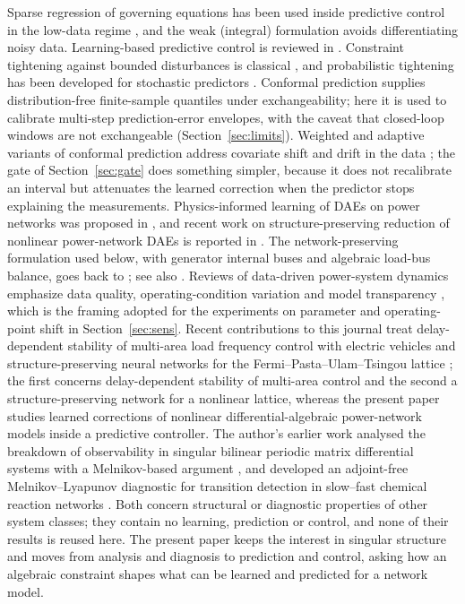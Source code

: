 \documentclass[preprint,12pt]{elsarticle}
\begin{document}
Sparse regression of governing equations \cite{brunton} has been used inside predictive control in the low-data regime \cite{kaiser}, and the weak (integral) formulation \cite{wsindy} avoids differentiating noisy data. Learning-based predictive control is reviewed in \cite{hewing}. Constraint tightening against bounded disturbances is classical \cite{mayne}, and probabilistic tightening has been developed for stochastic predictors \cite{lorenzen}. Conformal prediction \cite{vovk,angelopoulos} supplies distribution-free finite-sample quantiles under exchangeability; here it is used to calibrate multi-step prediction-error envelopes, with the caveat that closed-loop windows are not exchangeable (Section~\ref{sec:limits}). Weighted and adaptive variants of conformal prediction address covariate shift and drift in the data \cite{tibshirani,barber,gibbs}; the gate of Section~\ref{sec:gate} does something simpler, because it does not recalibrate an interval but attenuates the learned correction when the predictor stops explaining the measurements. Physics-informed learning of DAEs on power networks was proposed in \cite{moya}, and recent work on structure-preserving reduction of nonlinear power-network DAEs is reported in \cite{nadeem,banagaaya}. The network-preserving formulation used below, with generator internal buses and algebraic load-bus balance, goes back to \cite{bergenhill}; see also \cite{dorfler,kundur}. Reviews of data-driven power-system dynamics emphasize data quality, operating-condition variation and model transparency \cite{huang}, which is the framing adopted for the experiments on parameter and operating-point shift in Section~\ref{sec:sens}. Recent contributions to this journal treat delay-dependent stability of multi-area load frequency control with electric vehicles \cite{xiong} and structure-preserving neural networks for the Fermi--Pasta--Ulam--Tsingou lattice \cite{fan}; the first concerns delay-dependent stability of multi-area control and the second a structure-preserving network for a nonlinear lattice, whereas the present paper studies learned corrections of nonlinear differential-algebraic power-network models inside a predictive controller. The author's earlier work analysed the breakdown of observability in singular bilinear periodic matrix differential systems with a Melnikov-based argument \cite{madh}, and developed an adjoint-free Melnikov--Lyapunov diagnostic for transition detection in slow--fast chemical reaction networks \cite{madh2}. Both concern structural or diagnostic properties of other system classes; they contain no learning, prediction or control, and none of their results is reused here. The present paper keeps the interest in singular structure and moves from analysis and diagnosis to prediction and control, asking how an algebraic constraint shapes what can be learned and predicted for a network model.
\end{document}
